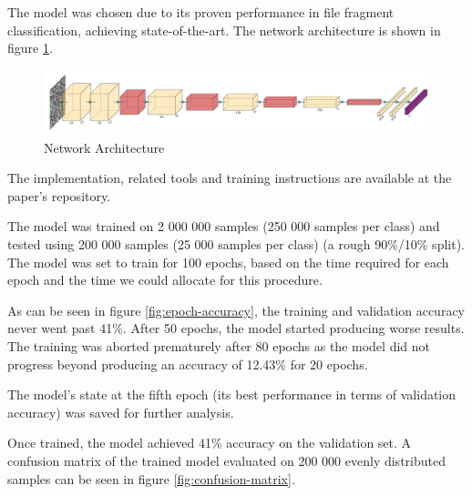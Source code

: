 \documentclass[conference]{IEEEtran}
\begin{document}
The model was chosen due to its proven performance in file fragment classification, achieving state-of-the-art\cite{chen2018}. The network architecture is shown in figure \ref{fig:cnn}.

\begin{figure}
    \centering
    \includegraphics[scale=0.45]{model.pdf}
    \caption{Network Architecture}
    \label{fig:cnn}
\end{figure}

The implementation, related tools and training instructions are available at the paper's repository.

The model was trained on 2 000 000 samples (250 000 samples per class) and tested using 200 000 samples (25 000 samples per class) (a rough 90\%/10\% split). The model was set to train for 100 epochs, based on the time required for each epoch and the time we could allocate for this procedure.

As can be seen in figure \ref{fig:epoch-accuracy}, the training and validation accuracy never went past 41\%. After 50 epochs, the model started producing worse results. The training was aborted prematurely after 80 epochs as the model did not progress beyond producing an accuracy of 12.43\% for 20 epochs.

The model's state at the fifth epoch (its best performance in terms of validation accuracy) was saved for further analysis.

Once trained, the model achieved 41\% accuracy on the validation set. A confusion matrix of the trained model evaluated on 200 000 evenly distributed samples can be seen in figure \ref{fig:confusion-matrix}.
\end{document}
